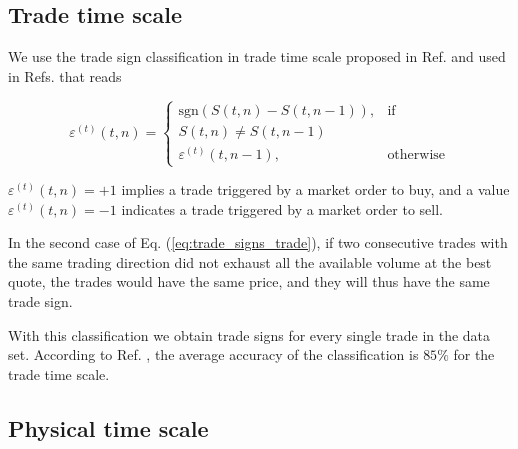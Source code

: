 \subsection{Trade time scale}\label{subsec:trade_time}

We use the trade sign classification in trade time scale proposed in Ref.
\cite{Wang_2016_cross} and used in Refs.
\cite{my_paper_response_financial,Wang_2017,Wang_2018_copulas,Wang_2016_avg}
that reads

\begin{equation}\label{eq:trade_signs_trade}
    \varepsilon^{\left(t\right)}\left(t,n\right)=\left\{
    \begin{array}{cc}
    \text{sgn}\left(S\left(t,n\right)-S\left(t,n-1\right)\right),
    & \text{if }\\ S\left(t,n\right) \ne S\left(t,n-1\right)\\
    \varepsilon^{\left(t\right)}\left(t,n-1\right),
    & \text{otherwise}
    \end{array}\right.
\end{equation}

$\varepsilon^{\left(t\right)}\left( t,n \right) = +1$ implies a trade triggered
by a market order to buy, and a value
$\varepsilon^{\left(t\right)}\left( t,n \right) = -1$ indicates a trade
triggered by a market order to sell.

In the second case of Eq. (\ref{eq:trade_signs_trade}), if two consecutive
trades with the same trading direction did not exhaust all the available volume
at the best quote, the trades would have the same price, and they will thus
have the same trade sign.

With this classification we obtain trade signs for every single trade in the
data set. According to Ref. \cite{Wang_2016_cross}, the average accuracy of the
classification is $85\%$ for the trade time scale.

\subsection{Physical time scale}\label{subsec:physical_time}


